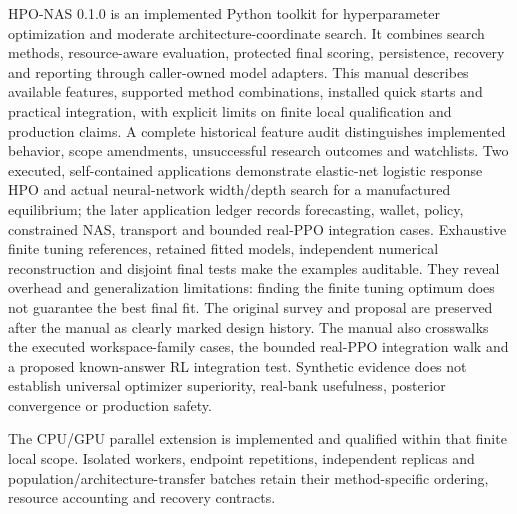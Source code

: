 HPO-NAS 0.1.0 is an implemented Python toolkit for hyperparameter optimization
and moderate architecture-coordinate search. It combines search methods,
resource-aware evaluation, protected final scoring, persistence, recovery and
reporting through caller-owned model adapters. This manual describes available
features, supported method combinations, installed quick starts and practical
integration, with explicit limits on finite local qualification and production
claims. A complete historical feature audit distinguishes implemented behavior,
scope amendments, unsuccessful research outcomes and watchlists. Two executed,
self-contained applications demonstrate elastic-net logistic response HPO and
actual neural-network width/depth search for a manufactured equilibrium; the
later application ledger records forecasting, wallet, policy, constrained NAS,
transport and bounded real-PPO integration cases.
Exhaustive finite tuning references, retained fitted models, independent
numerical reconstruction and disjoint final tests make the examples auditable.
They reveal overhead and generalization limitations: finding the finite tuning
optimum does not guarantee the best final fit. The original survey and proposal
are preserved after the manual as clearly marked design history. The manual
also crosswalks the executed workspace-family cases, the bounded real-PPO
integration walk and a proposed known-answer RL integration test. Synthetic
evidence does not establish universal optimizer superiority, real-bank
usefulness, posterior convergence or production safety.

The CPU/GPU parallel extension is implemented and qualified within that
finite local scope. Isolated workers, endpoint repetitions, independent
replicas and population/architecture-transfer batches retain their
method-specific ordering, resource accounting and recovery contracts.
